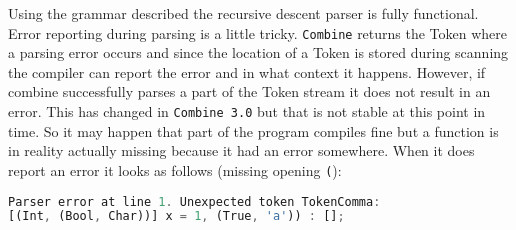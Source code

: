 \documentclass{article}
\begin{document}
Using the grammar described the recursive descent parser is fully functional. Error reporting during parsing is a little tricky. \texttt{Combine} returns the Token where a parsing error occurs and since the location of a Token is stored during scanning the compiler can report the error and in what context it happens. However, if combine successfully parses a part of the Token stream it does not result in an error. This has changed in \texttt{Combine 3.0} but that is not stable at this point in time. So it may happen that part of the program compiles fine but a function is in reality actually missing because it had an error somewhere. When it does report an error it looks as follows (missing opening \texttt{(}):
\begin{lstlisting}[language=Rust, style=boxed]
Parser error at line 1. Unexpected token TokenComma:
[(Int, (Bool, Char))] x = 1, (True, 'a')) : [];
\end{lstlisting}
\end{document}
